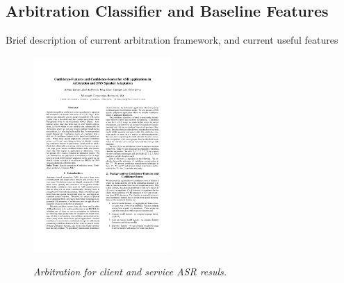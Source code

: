 \subsection{Arbitration Classifier and Baseline Features}\label{Sec:ArbitrationCC}
Brief description of current arbitration framework, and current useful features

\begin{figure}[h]
\centering
{\includegraphics[width=0.47\textwidth]{Arbitration}}
\caption{\it Arbitration for client and service ASR resuls.}
\label{Fig:Arbitration}
\end{figure}

